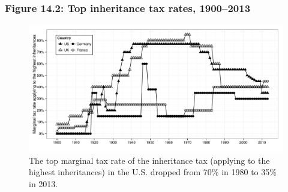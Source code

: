 \documentclass[t]{beamer}\usepackage[]{graphicx}\usepackage[]{color}
\newenvironment{knitrout}{}{} %
\begin{document}
\begin{frame}[label=Figure_14_2]
\frametitle{Figure 14.2: Top inheritance tax rates, 1900--2013}
\begin{figure}[t]
\begin{minipage}[b]{\textwidth}
\centering
\begin{knitrout}\footnotesize
{}\color{fgcolor}

{\centering \includegraphics[width=1\linewidth]{figures/bw/Figure_14_2} 

}



\end{knitrout}
\caption{The top marginal tax rate of the inheritance tax (applying to the highest inheritances) in the U.S. dropped from 70\% in 1980 to 35\% in 2013.}
\end{minipage}
\end{figure}
\end{frame}
\end{document}
